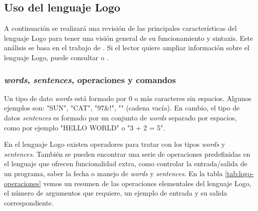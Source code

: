 \subsection{Uso del lenguaje Logo}
\label{sec:logo-lenguaje}

A continuación se realizará una revisión de las principales características del lenguaje Logo para tener una visión general de su funcionamiento y sintaxis. Este análisis se basa en el trabajo de \cite[p.274-305]{feurzeig1969programming}. Si el lector quiere ampliar información sobre el lenguaje Logo, puede consultar \cite{friendly2014advanced} o \cite{logo-resources}.


\subsubsection*{\emph{words}, \emph{sentences}, operaciones y comandos}

Un tipo de dato \emph{words} está formado por 0 o más caracteres sin espacios. Algunos ejemplos son: "SUN", "CAT", "97&!", "" (cadena vacía). En cambio, el tipo de datos \emph{sentences} es formado por un conjunto de \emph{words} separado por espacios, como por ejemplo "HELLO WORLD" o "3 + 2 = 5". 

En el lenguaje Logo existen operadores para tratar con los tipos \emph{words} y \emph{sentences}. También se pueden encontrar una serie de operaciones predefinidas en el lenguaje que ofrecen funcionalidad extra, como controlar la entrada/salida de un programa, saber la fecha o manejo de \emph{words} y \emph{sentences}. En la tabla \ref{tab:logo-operaciones} vemos un resumen de las operaciones elementales del lenguaje Logo, el número de argumentos que requiere, un ejemplo de entrada y su salida correspondiente.


